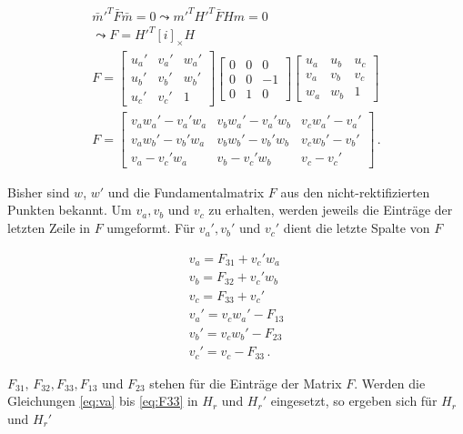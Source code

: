 \begin{gather}
	\bar{m}'^T\bar{F} \bar{m} = 0 \leadsto m'^T H'^T \bar{F} H m = 0\\
	\leadsto F = H'^T[i]_\times H\\
	F=
		\begin{bmatrix}
	u_a'&v_a'&w_a'\\
	u_b'&v_b'&w_b'\\
	u_c'&v_c'&1
	\end{bmatrix}
	\begin{bmatrix}
	0&0&0\\
	0&0&-1\\
	0&1&0
	\end{bmatrix} 
	\begin{bmatrix}
	u_a&u_b&u_c\\
	v_a&v_b&v_c\\
	w_a&w_b&1
	\end{bmatrix}\\
		F=
	\begin{bmatrix}
	v_aw_a' - v_a'w_a&v_bw_a' - v_a'w_b&v_cw_a' - v_a'\\
	v_aw_b' - v_b'w_a&v_bw_b' - v_b'w_b&v_cw_b' - v_b'\\
	v_a - v_c'w_a&v_b - v_c'w_b&v_c-v_c'
	\end{bmatrix} \, .\label{eq:6.45}
\end{gather}

Bisher sind $w$, $w'$ und die Fundamentalmatrix $F$ aus den nicht-rektifizierten Punkten bekannt. Um $v_a, v_b$ und $v_c$ zu erhalten, werden jeweils die Einträge der letzten Zeile in $F$ umgeformt. Für $v_a', v_b'$ und $v_c'$ dient die letzte Spalte von $F$


\begin{gather}
	v_a = F_{31}+v_c'w_a\label{eq:va}\\
	v_b = F_{32}+v_c'w_b\\
	v_c = F_{33}+v_c'\\
	v_a' = v_cw_a'-F_{13}\\
	v_b' = v_cw_b'-F_{23}\\
	v_c' = v_c -F_{33} \, .\label{eq:F33}
\end{gather}

$F_{31},\, F_{32}, F_{33} ,F_{13}$ und  $F_{23}$ stehen für die Einträge der Matrix $F$. Werden die Gleichungen \ref{eq:va} bis \ref{eq:F33} in $H_r$ und $H_r'$ eingesetzt, so ergeben sich für $H_r$ und $H_r'$ 


